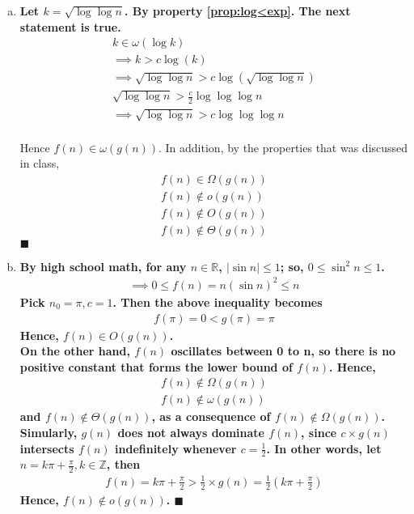 \documentclass[12pt]{article}
\begin{document}
\begin{enumerate}[a.]
\item
{\bf
Let $k = \sqrt{\log\log n}$.
By property \ref{prop:log<exp}. The next statement is true.
\begin{gather*}
k \in \omega(\log k)\\
\implies k > c\log(k)\\
\implies \sqrt{\log\log n} > c\log(\sqrt{\log\log n})\\
\sqrt{\log\log n} > \frac{c}{2}\log\log\log n\\
\implies \sqrt{\log\log n} > c\log\log\log n\\
\end{gather*}

Hence $f(n) \in \omega(g(n))$. In addition, by the properties that was discussed in class,
\begin{gather*}
f(n) \in \Omega(g(n))\\
f(n) \notin o(g(n))\\
f(n) \notin O(g(n))\\
f(n) \notin \Theta(g(n))
\end{gather*}
\hfill $\blacksquare$
}

\item
{\bf
By high school math, for any $ n \in \mathbb{R}$, $|\sin n| \le 1$; so, $0 \le \sin^2 n \le 1$.
\begin{gather*}
\implies 0 \le f(n) = n(\sin n)^2 \le n
\end{gather*}
Pick $n_0 = \pi, c=1$. Then the above inequality becomes 
\begin{gather*}
f(\pi) = 0 < g(\pi) = \pi
\end{gather*}
Hence, $f(n) \in O(g(n))$.\\
On the other hand, $f(n)$ oscillates between 0 to n, so there is no positive constant that forms the lower bound of $f(n)$. Hence, 
\begin{gather*}
f(n) \notin \Omega(g(n))\\
f(n) \notin \omega(g(n))
\end{gather*}
and $f(n) \notin \Theta(g(n))$, as a consequence of $f(n) \notin \Omega(g(n))$.\\

Simularly, $g(n)$ does not always dominate $f(n)$, since $c\times g(n)$ intersects $f(n)$ indefinitely whenever $c=\frac{1}{2}$. 
In other words, let $n= k\pi + \frac{\pi}{2}, k \in \mathbb{Z}$, then 
\begin{gather*}
f(n) =  k\pi + \frac{\pi}{2} > \frac{1}{2} \times g(n) =  \frac{1}{2} (k\pi + \frac{\pi}{2})
\end{gather*}
 Hence, $f(n) \notin o(g(n))$.
\hfill $\blacksquare$
}


\end{enumerate}
\end{document}
